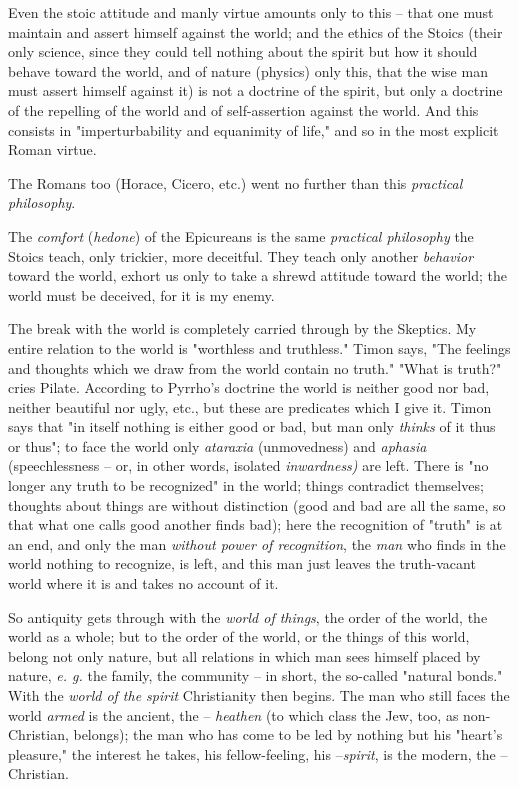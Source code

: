\documentclass[a4paper]{book}
\begin{document}
Even the stoic attitude and manly virtue amounts only to this -- that one must 
maintain and assert himself against the world; and the ethics of the Stoics 
(their only science, since they could tell nothing about the spirit but how it 
should behave toward the world, and of nature (physics) only this, that the 
wise man must assert himself against it) is not a doctrine of the spirit, but 
only a doctrine of the repelling of the world and of self-assertion against 
the world. And this consists in "{}imperturbability and equanimity of life,"{} 
and so in the most explicit Roman virtue.

The Romans too (Horace, Cicero, etc.) went no further than this 
\textit{practical philosophy}.

The \textit{comfort} (\textit{hedone}) of the Epicureans is the same 
\textit{practical philosophy} the Stoics teach, only trickier, more deceitful. 
They teach only another \textit{behavior} toward the world, exhort us only to 
take a shrewd attitude toward the world; the world must be deceived, for it is 
my enemy.

The break with the world is completely carried through by the Skeptics. My 
entire relation to the world is "{}worthless and truthless."{} Timon says, 
"{}The feelings and thoughts which we draw from the world contain no truth."{} 
"{}What is truth?"{} cries Pilate. According to Pyrrho's doctrine the world is 
neither good nor bad, neither beautiful nor ugly, etc., but these are 
predicates which I give it. Timon says that "{}in itself nothing is either 
good or bad, but man only \textit{thinks} of it thus or thus"{}; to face the 
world only \textit{ataraxia} (unmovedness) and \textit{aphasia} 
(speechlessness -- or, in other words, isolated \textit{inwardness)} are left. 
There is "{}no longer any truth to be recognized"{} in the world; things 
contradict themselves; thoughts about things are without distinction (good and 
bad are all the same, so that what one calls good another finds bad); here the 
recognition of "{}truth"{} is at an end, and only the man \textit{without 
power of recognition}, the \textit{man} who finds in the world nothing to 
recognize, is left, and this man just leaves the truth-vacant world where it 
is and takes no account of it.

So antiquity gets through with the \textit{world of things}, the order of the 
world, the world as a whole; but to the order of the world, or the things of 
this world, belong not only nature, but all relations in which man sees 
himself placed by nature, \textit{e. g.} the family, the community -- in 
short, the so-called "{}natural bonds."{} With the \textit{world of the 
spirit} Christianity then begins. The man who still faces the world 
\textit{armed} is the ancient, the -- \textit{heathen} (to which class the 
Jew, too, as non-Christian, belongs); the man who has come to be led by 
nothing but his "{}heart's pleasure,"{} the interest he takes, his 
fellow-feeling, his --\textit{spirit}, is the modern, the -- Christian.
\end{document}
